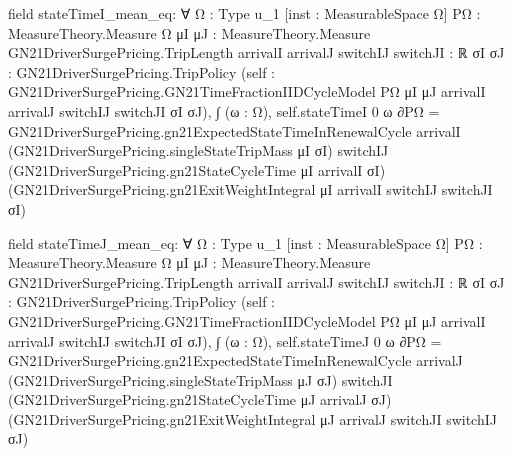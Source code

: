\documentclass[10pt]{article}
\begin{document}
\begin{ReviewVerbatim}
field stateTimeI_mean_eq:
∀ {Ω : Type u_1} [inst : MeasurableSpace Ω] {PΩ : MeasureTheory.Measure Ω}
  {μI μJ : MeasureTheory.Measure GN21DriverSurgePricing.TripLength} {arrivalI arrivalJ switchIJ switchJI : ℝ}
  {σI σJ : GN21DriverSurgePricing.TripPolicy}
  (self : GN21DriverSurgePricing.GN21TimeFractionIIDCycleModel PΩ μI μJ arrivalI arrivalJ switchIJ switchJI σI σJ),
  ∫ (ω : Ω), self.stateTimeI 0 ω ∂PΩ =
    GN21DriverSurgePricing.gn21ExpectedStateTimeInRenewalCycle arrivalI
      (GN21DriverSurgePricing.singleStateTripMass μI σI) switchIJ
      (GN21DriverSurgePricing.gn21StateCycleTime μI arrivalI σI)
      (GN21DriverSurgePricing.gn21ExitWeightIntegral μI arrivalI switchIJ switchJI σI)

field stateTimeJ_mean_eq:
∀ {Ω : Type u_1} [inst : MeasurableSpace Ω] {PΩ : MeasureTheory.Measure Ω}
  {μI μJ : MeasureTheory.Measure GN21DriverSurgePricing.TripLength} {arrivalI arrivalJ switchIJ switchJI : ℝ}
  {σI σJ : GN21DriverSurgePricing.TripPolicy}
  (self : GN21DriverSurgePricing.GN21TimeFractionIIDCycleModel PΩ μI μJ arrivalI arrivalJ switchIJ switchJI σI σJ),
  ∫ (ω : Ω), self.stateTimeJ 0 ω ∂PΩ =
    GN21DriverSurgePricing.gn21ExpectedStateTimeInRenewalCycle arrivalJ
      (GN21DriverSurgePricing.singleStateTripMass μJ σJ) switchJI
      (GN21DriverSurgePricing.gn21StateCycleTime μJ arrivalJ σJ)
      (GN21DriverSurgePricing.gn21ExitWeightIntegral μJ arrivalJ switchJI switchIJ σJ)
\end{ReviewVerbatim}
\end{document}
